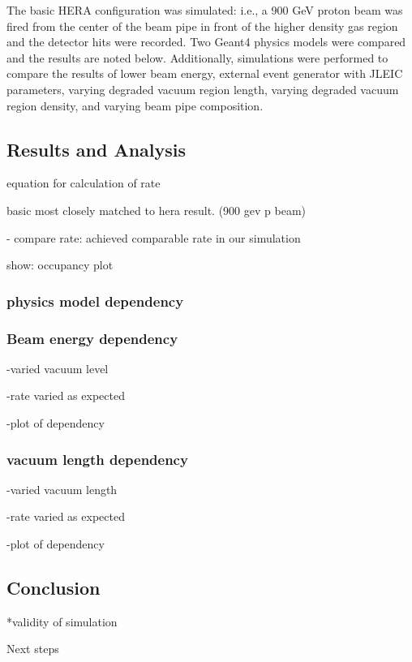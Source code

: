 The basic HERA configuration was simulated: i.e., a 900 GeV proton beam was fired from the center of the beam pipe in front of the higher density gas region and the detector hits were recorded.  Two Geant4 physics models were compared and the results are noted below.  Additionally, simulations were performed to compare the results of lower beam energy, external event generator with JLEIC parameters, varying degraded vacuum region length, varying degraded vacuum region density, and varying beam pipe composition.
\subsection{Results and Analysis}
equation for calculation of rate

basic most closely matched to hera result. (900 gev p beam)

- compare rate: achieved comparable rate in our simulation

show: occupancy plot

\subsubsection{physics model dependency}
\subsubsection{Beam energy dependency}

-varied vacuum level

-rate varied as expected

-plot of dependency

\subsubsection{vacuum length dependency}
-varied vacuum length

-rate varied as expected

-plot of dependency

\subsection{Conclusion}
*validity of simulation

Next steps

